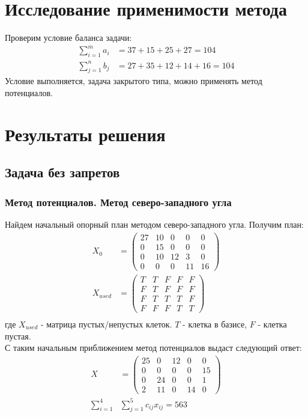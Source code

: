 \section{Исследование применимости метода}
Проверим условие баланса задачи:
\begin{align*}
\sum_{i=1}^m a_i &= 37 + 15 + 25 + 27 = 104 \\
\sum_{j=1}^n b_j &=27+35+12+14+16 = 104
\end{align*} 
Условие выполняется, задача закрытого типа, можно применять метод потенциалов.


\section{Результаты решения}
\subsection{Задача без запретов}
\subsubsection{Метод потенциалов. Метод северо-западного угла}
Найдем начальный опорный план методом северо-западного угла. Получим план:
\begin{align*}
	X_0 &=
		\begin{pmatrix} 
			27 & 10 & 0 & 0 & 0 \\ 
			0 & 15 & 0 & 0 & 0 \\ 
			0 & 10 & 12 & 3 & 0 \\ 
			0 & 0 & 0 & 11 & 16
		\end{pmatrix} \\
	X_{used} &=
		\begin{pmatrix} 
			T & T & F & F & F \\ 
			F & T & F & F & F \\ 
			F & T & T & T & F \\ 
			F & F & F & T & T
		\end{pmatrix} \\
\end{align*}
где $X_{used}$ - матрица пустых/непустых клеток. $T$ - клетка в базисе, $F$ - клетка пустая. \\
С таким начальным приближением метод потенциалов выдаст следующий ответ:
\begin{align*}
	X &=
		\begin{pmatrix} 
			25 & 0 & 12 & 0 & 0 \\ 
			0 & 0 & 0 & 0 & 15 \\ 
			0 & 24 & 0 & 0 & 1 \\ 
			2 & 11 & 0 & 14 & 0
		\end{pmatrix} \\
	\sum_{i=1}^4 &\sum_{j=1}^5 c_{ij} x_{ij} = 563
\end{align*}

